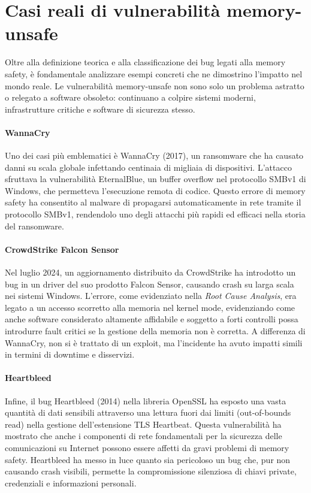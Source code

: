 \section{Casi reali di vulnerabilità memory-unsafe}
\label{sec:real_vulnerabilities}

Oltre alla definizione teorica e alla classificazione dei bug legati alla memory
safety, è fondamentale analizzare esempi concreti che ne dimostrino l'impatto
nel mondo reale. Le vulnerabilità memory-unsafe non sono solo un problema astratto
o relegato a software obsoleto: continuano a colpire sistemi moderni, infrastrutture
critiche e software di sicurezza stesso.

\paragraph{WannaCry}
\label{sec:wannacry} Uno dei casi più emblematici è WannaCry (2017), un ransomware
che ha causato danni su scala globale infettando centinaia di migliaia di dispositivi.
L'attacco sfruttava la vulnerabilità EternalBlue\cite{eternalblue}, un buffer
overflow nel protocollo SMBv1 di Windows, che permetteva l'esecuzione remota di codice.
Questo errore di memory safety ha consentito al malware di propagarsi
automaticamente in rete tramite il protocollo SMBv1, rendendolo uno degli attacchi
più rapidi ed efficaci nella storia del ransomware.

\paragraph{CrowdStrike Falcon Sensor}
\label{sec:crowdstrike} Nel luglio 2024, un aggiornamento distribuito da CrowdStrike
ha introdotto un bug in un driver del suo prodotto Falcon Sensor, causando crash
su larga scala nei sistemi Windows. L'errore, come evidenziato nella \textit{Root
Cause Analysis}\cite{crowdstrike_rca}, era legato a un accesso scorretto alla memoria
nel kernel mode, evidenziando come anche software considerato altamente
affidabile e soggetto a forti controlli possa introdurre fault critici se la
gestione della memoria non è corretta. A differenza di WannaCry, non si è
trattato di un exploit, ma l'incidente ha avuto impatti simili in termini di downtime
e disservizi.

\paragraph{Heartbleed}
\label{sec:heartbleed} Infine, il bug Heartbleed (2014) nella libreria OpenSSL ha
esposto una vasta quantità di dati sensibili attraverso una lettura fuori dai limiti
(out-of-bounds read) nella gestione dell'estensione TLS Heartbeat\cite{heartbleed}. Questa
vulnerabilità ha mostrato che anche i componenti di rete fondamentali per la
sicurezza delle comunicazioni su Internet possono essere affetti da gravi
problemi di memory safety. Heartbleed ha messo in luce quanto sia pericoloso un bug
che, pur non causando crash visibili, permette la compromissione silenziosa di chiavi
private, credenziali e informazioni personali.\\

